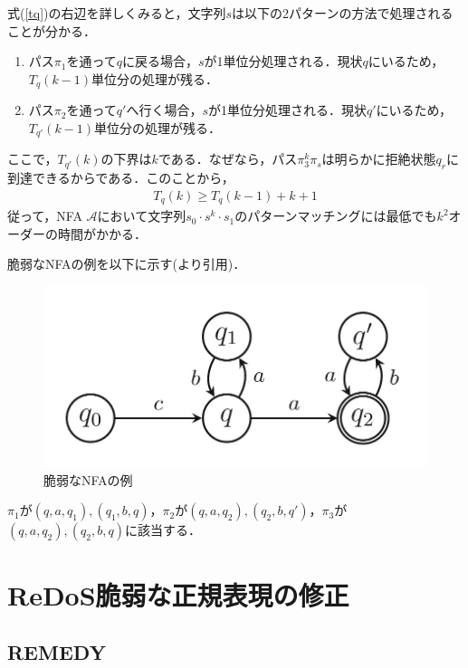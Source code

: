 \documentclass[a4paper, 12pt, dvipdfmx, uplatex]{jsreport}
\begin{document}
式(\ref{tq})の右辺を詳しくみると，文字列$s$は以下の2パターンの方法で処理されることが分かる．
\begin{enumerate}
  \item パス$\pi_1$を通って$q$に戻る場合，$s$が1単位分処理される．現状$q$にいるため，$T_q(k-1)$単位分の処理が残る．
  \item パス$\pi_2$を通って$q'$へ行く場合，$s$が1単位分処理される．現状$q'$にいるため，$T_{q'}(k-1)$単位分の処理が残る．
\end{enumerate}

ここで，$T_{q'}(k)$の下界は$k$である．なぜなら，パス$\pi_3^k \pi_s$は明らかに拒絶状態$q_r$に到達できるからである．このことから，
\begin{align*}
  T_q(k)\geq T_q(k-1)+k+1
\end{align*}
従って，NFA $\mathcal{A}$において文字列$s_0\cdot s^k\cdot s_1$のパターンマッチングには最低でも$k^2$オーダーの時間がかかる．

脆弱なNFAの例を以下に示す(\cite{vul_detect}より引用)．
\begin{figure}[H] %
  \centering
  \includegraphics[width=0.75\linewidth]{../figures/vul_ex.jpg}
  \caption{脆弱なNFAの例\label{vul_ex}}
\end{figure}

$\pi_1$が$(q,a,q_1),(q_1,b,q)$，$\pi_2$が$(q,a,q_2),(q_2,b,q')$，$\pi_3$が$(q,a,q_2),(q_2,b,q)$に該当する．





\section{ReDoS脆弱な正規表現の修正}

\subsection{REMEDY}










\end{document}
